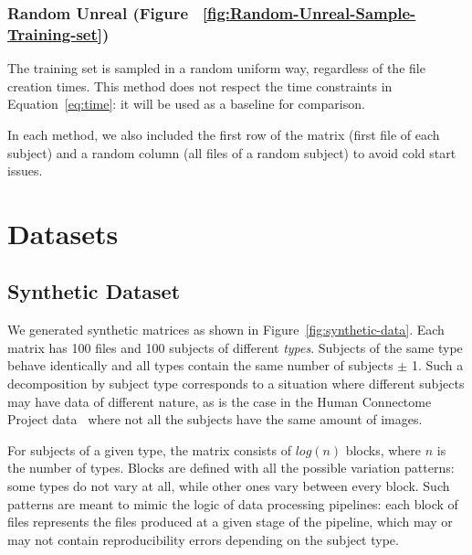 \documentclass[10pt, conference, compsocconf]{IEEEtran}
\begin{document}
\subsubsection{Random Unreal (Figure 
~\ref{fig:Random-Unreal-Sample-Training-set})} The training set is 
sampled in a random uniform way, regardless of the file creation 
times. This method does not respect the time constraints in 
Equation~\ref{eq:time}: it will be used as a baseline for comparison.

In each method, we also included the first row of the matrix (first 
 file of each subject) and a random column (all files of a 
random subject) to avoid cold start issues. 


\section{Datasets}

\label{sec:datasets}

\subsection{Synthetic Dataset}

We generated synthetic matrices as shown in 
Figure~\ref{fig:synthetic-data}. Each matrix has 100 files and 100 
subjects of different \emph{types}. Subjects of the same type behave 
identically and all types contain the same number of subjects $\pm$ 1. 
Such a decomposition by subject type corresponds to a situation where 
different subjects may have data of different nature, as is the case in the
Human Connectome Project data~\cite{van2013wu} where not all the 
subjects have the same amount of images.

 For subjects of a given type, the matrix consists of 
 $log(n)$  blocks, where $n$ is the number of types. Blocks are 
 defined with all the possible variation patterns: some types do not 
 vary at all, while other ones vary between every block. Such 
 patterns are meant to mimic the logic of data 
processing pipelines: each block of files represents the files produced 
at a given stage of the pipeline, which may or may not contain 
reproducibility errors depending on the subject type.
\end{document}
